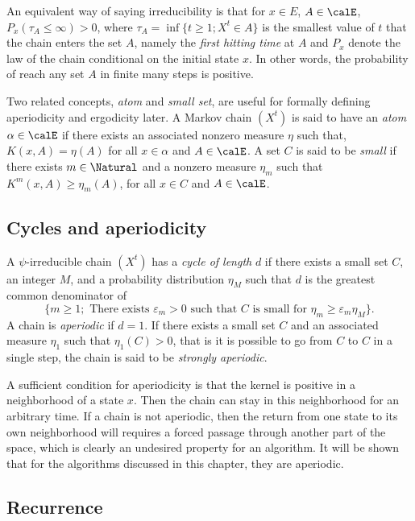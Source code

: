 An equivalent way of saying irreducibility is that for $x\in E$, $A\in\calE$, $P_x(\tau_A\le\infty) > 0$, where $\tau_A = \inf\{t\ge1;X^t\in A\}$ is the smallest value of $t$ that the chain enters the set $A$, namely the \emph{first hitting time} at $A$ and $P_x$ denote the law of the chain conditional on the initial state $x$. In other words, the probability of reach any set $A$ in finite many steps is positive.

Two related concepts, \emph{atom} and \emph{small set}, are useful for formally defining aperiodicity and ergodicity later. A Markov chain $(X^t)$ is said to have an \emph{atom} $\alpha\in\calE$ if there exists an associated nonzero measure $\eta$ such that, $K(x,A) = \eta(A)$ for all $x\in\alpha$ and $A\in\calE$. A set $C$ is said to be \emph{small} if there exists $m\in\Natural$ and a nonzero measure $\eta_m$ such that $K^m(x,A)\ge\eta_m(A)$, for all $x\in C$ and $A\in\calE$.

\subsection{Cycles and aperiodicity}
\label{sub: Appdendix Cycles and Aperiodicity}

A $\psi$-irreducible chain $(X^t)$ has a \emph{cycle of length} $d$ if there exists a small set $C$, an integer $M$, and a probability distribution $\eta_M$ such that $d$ is the greatest common denominator of
\begin{equation*}
  \{m\ge1;\text{ There exists }\varepsilon_m > 0\text{ such that }C\text{ is
    small for }\eta_m\ge\varepsilon_m\eta_M\}.
\end{equation*}
A chain is \emph{aperiodic} if $d = 1$. If there exists a small set $C$ and an associated measure $\eta_1$ such that $\eta_1(C) > 0$, that is it is possible to go from $C$ to $C$ in a single step, the chain is said to be \emph{strongly aperiodic}.

A sufficient condition for aperiodicity is that the kernel is positive in a neighborhood of a state $x$. Then the chain can stay in this neighborhood for an arbitrary time. If a chain is not aperiodic, then the return from one state to its own neighborhood will requires a forced passage through another part of the space, which is clearly an undesired property for an \mcmc algorithm. It will be shown that for the algorithms discussed in this chapter, they are aperiodic.

\subsection{Recurrence}
\label{sub: Appdendix Recurrence}

